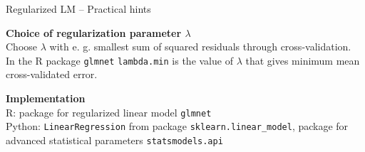 \documentclass[11pt,compress,t,notes=noshow, xcolor=table]{beamer}
\newcommand{\highlight}[1]{\textcolor{highlightcol}{\textbf{#1}}}
\let\code=\texttt
\begin{document}
\begin{frame}{Regularized LM -- Practical hints}

\footnotesize

  \highlight{Choice of regularization parameter  $\lambda$} \\
  \smallskip
 Choose $\lambda$ with e. g. smallest sum of squared residuals through cross-validation. \\
 In the R package \code{glmnet} \code{lambda.min} is the value of $\lambda$ that gives minimum mean cross-validated error.
 
 

\lz

  \highlight{Implementation} \\
  \smallskip
  R: package for regularized linear model \code{glmnet}\\
  Python: \code{LinearRegression} from package \code{sklearn.linear\_model}, package for advanced statistical parameters \code{statsmodels.api}

\end{frame}

\end{document}
